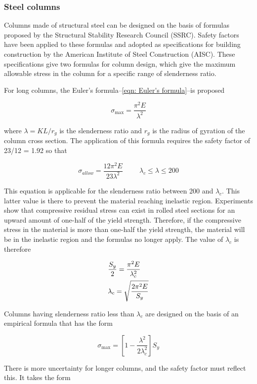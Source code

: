 \documentclass[
10pt,
a4paper,
openany,
svgnames,
]{book}
\begin{document}
\subsubsection{Steel columns}

Columns made of structural steel can be designed on the basis of formulas proposed by the Structural Stability Research Council (SSRC). Safety factors have been applied to these formulas and adopted as specifications for building construction by the American Institute of Steel Construction (AISC). These specifications give two formulas for column design, which give the maximum allowable stress in the column for a specific range of slenderness ratio.

For long columns, the Euler’s formula--\cref{eqn: Euler's formula}--is proposed

\[\sigma_{\max} = \frac{\pi^2E}{\lambda^2}\]

where $\lambda = KL/r_g$ is the slenderness ratio and $r_g$ is the radius of gyration of the column cross section. The application of this formula requires the safety factor of 23/12 = 1.92 so that

\[\sigma_{allow} = \frac{12\pi^2E}{23\lambda^2} \hspace{1cm} \lambda_c \leqslant \lambda \leqslant 200\]

This equation is applicable for the slenderness ratio between 200 and $\lambda_c$. This latter value is there to prevent the material reaching inelastic region. Experiments show that compressive residual stress can exist in rolled steel sections for an upward amount of one-half of the yield strength. Therefore, if the compressive stress in the material is more than one-half the yield strength, the material will be in the inelastic region and the formulas no longer apply. The value of $\lambda_c$ is therefore

\begin{gather*}
  \frac{S_y}{2} = \frac{\pi ^2E}{\lambda_c^2} \hfill \\
  \lambda_c = \sqrt {\frac{2\pi^2E}{S_y}}  \hfill 
\end{gather*}

Columns having slenderness ratio less than $\lambda_c$ are designed on the basis of an empirical formula that has the form

$$ \sigma _{\max} = \left[ 1 - \frac{\lambda^2}{2\lambda_c^2} \right]S_y $$

There is more uncertainty for longer columns, and the safety factor must reflect this. It takes the form
\end{document}
